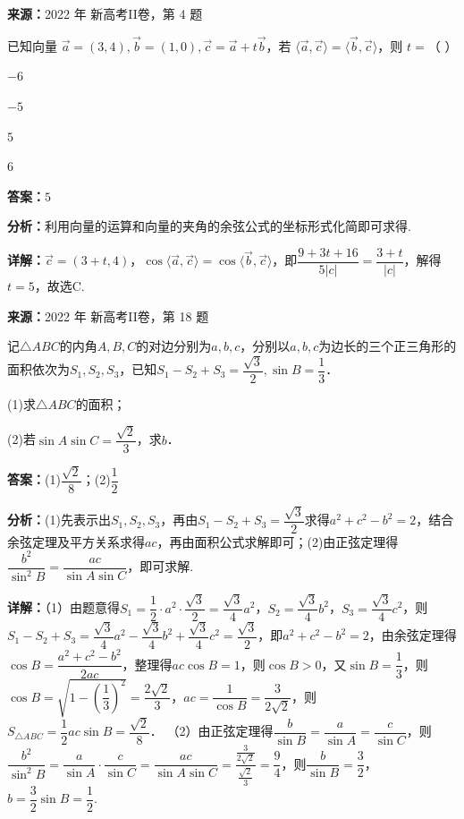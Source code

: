 \begin{question}[points=5]
\textbf{来源：}2022 年 新高考II卷，第 4 题\par
已知向量 $\vec{a}=(3,4),\vec{b}=(1,0),\vec{c}=\vec{a}+t\vec{b}$，若 $\langle\vec{a},\vec{c}\rangle=\langle\vec{b},\vec{c}\rangle$，则 $t=$（ ）
\begin{choices}
  \item $-6$
  \item $-5$
  \item $5$
  \item $6$
\end{choices}
\begin{solution}
\textbf{答案：}$5$

\textbf{分析：}利用向量的运算和向量的夹角的余弦公式的坐标形式化简即可求得.

\textbf{详解：}$\vec{c}=(3+t,4)$，$\cos\langle\vec{a},\vec{c}\rangle=\cos\langle\vec{b},\vec{c}\rangle$，即$\dfrac{9+3t+16}{5|c|}=\dfrac{3+t}{|c|}$，解得$t=5$，故选C.
\end{solution}
\end{question}

\begin{question}[points=12]
\textbf{来源：}2022 年 新高考II卷，第 18 题\par
记$\triangle ABC$的内角$A,B,C$的对边分别为$a,b,c$，分别以$a,b,c$为边长的三个正三角形的面积依次为$S_1,S_2,S_3$，已知$S_1-S_2+S_3=\dfrac{\sqrt{3}}{2},\sin B=\dfrac{1}{3}$．

(1)求$\triangle ABC$的面积；

(2)若$\sin A\sin C=\dfrac{\sqrt{2}}{3}$，求$b$．
\begin{solution}
\textbf{答案：}(1)$\dfrac{\sqrt{2}}{8}$；(2)$\dfrac{1}{2}$

\textbf{分析：}(1)先表示出$S_1,S_2,S_3$，再由$S_1-S_2+S_3=\dfrac{\sqrt{3}}{2}$求得$a^2+c^2-b^2=2$，结合余弦定理及平方关系求得$ac$，再由面积公式求解即可；(2)由正弦定理得$\dfrac{b^2}{\sin^2 B}=\dfrac{ac}{\sin A\sin C}$，即可求解.

\textbf{详解：}（1）由题意得$S_1=\dfrac{1}{2}\cdot a^2\cdot\dfrac{\sqrt{3}}{2}=\dfrac{\sqrt{3}}{4}a^2$，$S_2=\dfrac{\sqrt{3}}{4}b^2$，$S_3=\dfrac{\sqrt{3}}{4}c^2$，则$S_1-S_2+S_3=\dfrac{\sqrt{3}}{4}a^2-\dfrac{\sqrt{3}}{4}b^2+\dfrac{\sqrt{3}}{4}c^2=\dfrac{\sqrt{3}}{2}$，即$a^2+c^2-b^2=2$，由余弦定理得$\cos B=\dfrac{a^2+c^2-b^2}{2ac}$，整理得$ac\cos B=1$，则$\cos B>0$，又$\sin B=\dfrac{1}{3}$，则$\cos B=\sqrt{1-\left(\dfrac{1}{3}\right)^2}=\dfrac{2\sqrt{2}}{3}$，$ac=\dfrac{1}{\cos B}=\dfrac{3}{2\sqrt{2}}$，则$S_{\triangle ABC}=\dfrac{1}{2}ac\sin B=\dfrac{\sqrt{2}}{8}$．
（2）由正弦定理得$\dfrac{b}{\sin B}=\dfrac{a}{\sin A}=\dfrac{c}{\sin C}$，则$\dfrac{b^2}{\sin^2 B}=\dfrac{a}{\sin A}\cdot\dfrac{c}{\sin C}=\dfrac{ac}{\sin A\sin C}=\dfrac{\frac{3}{2\sqrt{2}}}{\frac{\sqrt{2}}{3}}=\dfrac{9}{4}$，则$\dfrac{b}{\sin B}=\dfrac{3}{2}$，$b=\dfrac{3}{2}\sin B=\dfrac{1}{2}$.
\end{solution}
\end{question}

